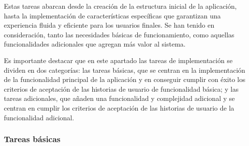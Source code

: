 \documentclass[12pt]{article}
\begin{document}
Estas tareas abarcan desde la creación de la estructura inicial de la aplicación, hasta la implementación de características específicas que 
garantizan una experiencia fluida y eficiente para los usuarios finales. Se han tenido en consideración, tanto las necesidades básicas de funcionamiento, como aquellas funcionalidades
adicionales que agregan más valor al sistema.

Es importante destacar que en este apartado las tareas de implementación se dividen en dos categorías: las tareas básicas, que se centran en la implementación de la funcionalidad
principal de la aplicación y en conseguir cumplir con éxito los criterios de aceptación de las historias de usuario de funcionalidad básica; y las tareas adicionales, que 
añaden una funcionalidad y complejidad adicional y se centran en cumplir los criterios de aceptación de las historias de usuario de la funcionalidad adicional.

\subsubsection{Tareas básicas}
\end{document}
